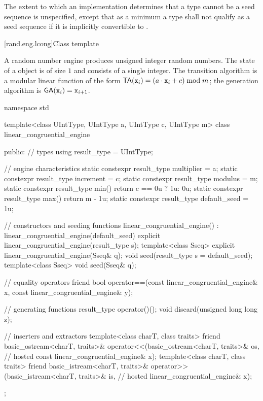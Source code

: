 The extent to which an implementation determines that a type cannot be a seed sequence
is unspecified, except that as a minimum a type shall not qualify as a seed sequence
if it is implicitly convertible to .


[rand.eng.lcong]{Class template }%
%

\pnum
A  random number engine
produces unsigned integer random numbers.
The state 
of a  object 
is of size $1$
and consists of a single integer.
The transition algorithm
is a modular linear function of the form
$\mathsf{TA}(\state{x}{i}) = (a \cdot \state{x}{i} + c) \bmod m$;
the generation algorithm
is $\mathsf{GA}(\state{x}{i}) = \state{x}{i+1}$.

%
%
\begin{codeblock}
namespace std {
  template<class UIntType, UIntType a, UIntType c, UIntType m>
  class linear_congruential_engine {
  public:
    // types
    using result_type = UIntType;

    // engine characteristics
    static constexpr result_type multiplier = a;
    static constexpr result_type increment = c;
    static constexpr result_type modulus = m;
    static constexpr result_type min() { return c == 0u ? 1u: 0u; }
    static constexpr result_type max() { return m - 1u; }
    static constexpr result_type default_seed = 1u;

    // constructors and seeding functions
    linear_congruential_engine() : linear_congruential_engine(default_seed) {}
    explicit linear_congruential_engine(result_type s);
    template<class Sseq> explicit linear_congruential_engine(Sseq& q);
    void seed(result_type s = default_seed);
    template<class Sseq> void seed(Sseq& q);

    // equality operators
    friend bool operator==(const linear_congruential_engine& x,
                           const linear_congruential_engine& y);

    // generating functions
    result_type operator()();
    void discard(unsigned long long z);

    // inserters and extractors
    template<class charT, class traits>
      friend basic_ostream<charT, traits>&
        operator<<(basic_ostream<charT, traits>& os,            // hosted
                   const linear_congruential_engine& x);
    template<class charT, class traits>
      friend basic_istream<charT, traits>&
        operator>>(basic_istream<charT, traits>& is,            // hosted
                   linear_congruential_engine& x);
  };
}
\end{codeblock}

